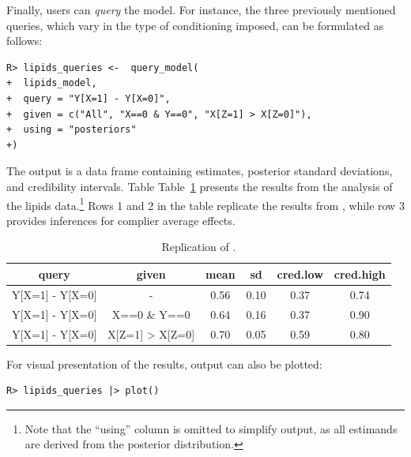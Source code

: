\documentclass[
  11pt,
  article]{jss}
\begin{document}
Finally, users can \emph{query} the model. For instance, the three
previously mentioned queries, which vary in the type of conditioning
imposed, can be formulated as follows:

\begin{verbatim}
R> lipids_queries <-  query_model(
+  lipids_model,
+  query = "Y[X=1] - Y[X=0]",
+  given = c("All", "X==0 & Y==0", "X[Z=1] > X[Z=0]"),
+  using = "posteriors"
+)
\end{verbatim}

The output is a data frame containing estimates, posterior standard
deviations, and credibility intervals. Table Table~\ref{tbl-lipids}
presents the results from the analysis of the lipids data.\footnote{Note
  that the ``using'' column is omitted to simplify output, as all
  estimands are derived from the posterior distribution.} Rows 1 and 2
in the table replicate the results from
\citet{chickering_clinicians_1996}, while row 3 provides inferences for
complier average effects.

\begin{longtable}[t]{cccccc}

\caption{\label{tbl-lipids}Replication of
\citet{chickering_clinicians_1996}.}

\tabularnewline

\toprule
query & given & mean & sd & cred.low & cred.high\\
\midrule
Y[X=1] - Y[X=0] & - & 0.56 & 0.10 & 0.37 & 0.74\\
Y[X=1] - Y[X=0] & X==0 \& Y==0 & 0.64 & 0.16 & 0.37 & 0.90\\
Y[X=1] - Y[X=0] & X[Z=1] > X[Z=0] & 0.70 & 0.05 & 0.59 & 0.80\\
\bottomrule

\end{longtable}

For visual presentation of the results, output can also be plotted:

\begin{verbatim}
R> lipids_queries |> plot()
\end{verbatim}
\end{document}

